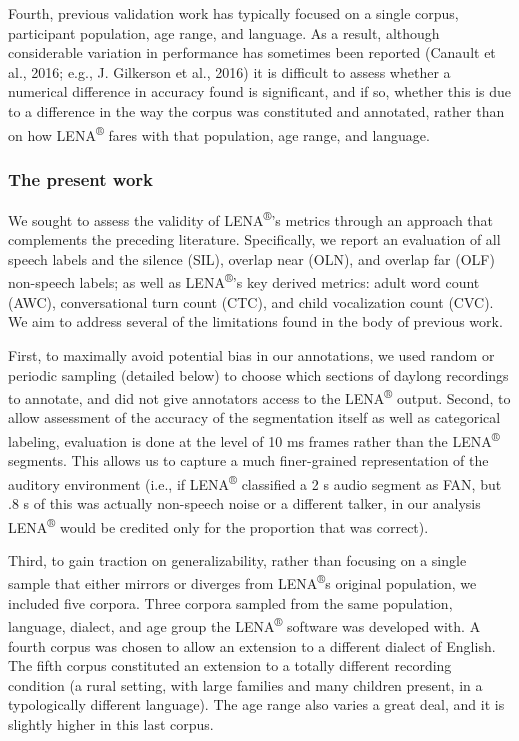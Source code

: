 \documentclass[english,floatsintext,man]{apa6}
\begin{document}
Fourth, previous validation work has typically focused on a single
corpus, participant population, age range, and language. As a result,
although considerable variation in performance has sometimes been
reported (Canault et al., 2016; e.g., J. Gilkerson et al., 2016) it is
difficult to assess whether a numerical difference in accuracy found is
significant, and if so, whether this is due to a difference in the way
the corpus was constituted and annotated, rather than on how
LENA\textsuperscript{®} fares with that population, age range, and
language.

\subsubsection{The present work}\label{the-present-work}

We sought to assess the validity of LENA\textsuperscript{®}'s metrics
through an approach that complements the preceding literature.
Specifically, we report an evaluation of all speech labels and the
silence (SIL), overlap near (OLN), and overlap far (OLF) non-speech
labels; as well as LENA\textsuperscript{®}'s key derived metrics: adult
word count (AWC), conversational turn count (CTC), and child
vocalization count (CVC). We aim to address several of the limitations
found in the body of previous work.

First, to maximally avoid potential bias in our annotations, we used
random or periodic sampling (detailed below) to choose which sections of
daylong recordings to annotate, and did not give annotators access to
the LENA\textsuperscript{®} output. Second, to allow assessment of the
accuracy of the segmentation itself as well as categorical labeling,
evaluation is done at the level of 10 ms frames rather than the
LENA\textsuperscript{®} segments. This allows us to capture a much
finer-grained representation of the auditory environment (i.e., if
LENA\textsuperscript{®} classified a 2 s audio segment as FAN, but .8 s
of this was actually non-speech noise or a different talker, in our
analysis LENA\textsuperscript{®} would be credited only for the
proportion that was correct).

Third, to gain traction on generalizability, rather than focusing on a
single sample that either mirrors or diverges from
LENA\textsuperscript{®}s original population, we included five corpora.
Three corpora sampled from the same population, language, dialect, and
age group the LENA\textsuperscript{®} software was developed with. A
fourth corpus was chosen to allow an extension to a different dialect of
English. The fifth corpus constituted an extension to a totally
different recording condition (a rural setting, with large families and
many children present, in a typologically different language). The age
range also varies a great deal, and it is slightly higher in this last
corpus.
\end{document}
